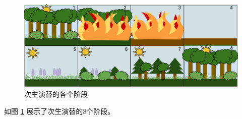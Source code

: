 \begin{figure}[htbp]
    \centering
    \includegraphics[width=400pt]{images/secondary-succession.png}
    \caption{次生演替的各个阶段}
    \label{fig:secondary-succession}
\end{figure}

如图 \ref{fig:secondary-succession} 展示了次生演替的8个阶段。
